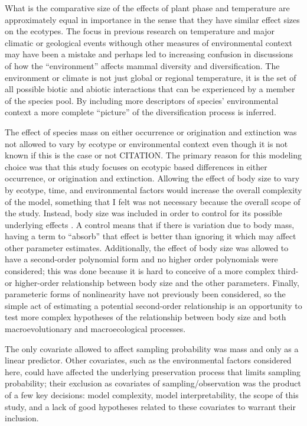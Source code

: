 \documentclass[12pt,letterpaper]{article}
\begin{document}
What is the comparative size of the effects of plant phase and temperature are approximately equal in importance in the sense that they have similar effect sizes on the ecotypes. The focus in previous research on temperature and major climatic or geological events withough other measures of environmental context may have been a mistake and perhaps led to increasing confusion in discussions of how the ``environment'' affects mammal diversity and diversification. The environment or climate is not just global or regional temperature, it is the set of all possible biotic and abiotic interactions that can be experienced by a member of the species pool. By including more descriptors of species' environmental context a more complete ``picture'' of the diversification process is inferred.


The effect of species mass on either occurrence or origination and extinction was not allowed to vary by ecotype or environmental context even though it is not known if this is the case or not CITATION. The primary reason for this modeling choice was that this study focuses on ecotypic based differences in either occurrence, or origination and extinction. Allowing the effect of body size to vary by ecotype, time, and environmental factors would increase the overall complexity of the model, something that I felt was not necessary because the overall scope of the study. Instead, body size was included in order to control for its possible underlying effects \citep{McElreath2016}. A control means that if there is variation due to body mass, having a term to ``absorb'' that effect is better than ignoring it which may affect other parameter estimates. Additionally, the effect of body size was allowed to have a second-order polynomial form and no higher order polynomials were considered; this was done because it is hard to conceive of a more complex third- or higher-order relationship between body size and the other parameters. Finally, parameteric forms of nonlinearity have not previously been considered, so the simple act of estimating a potential second-order relationship is an opportunity to test more complex hypotheses of the relationship between body size and both macroevolutionary and macroecological processes.

The only covariate allowed to affect sampling probability was mass and only as a linear predictor. Other covariates, such as the environmental factors considered here, could have affected the underlying preservation process that limits sampling probability; their exclusion as covariates of sampling/observation was the product of a few key decisions: model complexity, model interpretability, the scope of this study, and a lack of good hypotheses related to these covariates to warrant their inclusion. %
\end{document}
